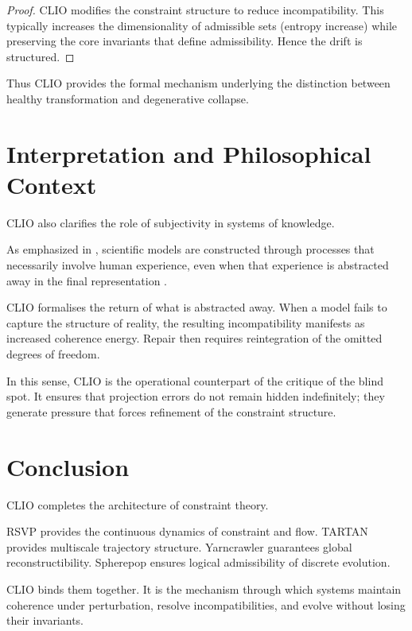 \documentclass[11pt,openany]{book}
\begin{document}
\begin{proof}
CLIO modifies the constraint structure to reduce
incompatibility.  This typically increases the dimensionality
of admissible sets (entropy increase) while preserving the
core invariants that define admissibility.  Hence the drift
is structured.
\end{proof}

Thus CLIO provides the formal mechanism underlying the
distinction between healthy transformation and degenerative
collapse.

\section{Interpretation and Philosophical Context}
\label{sec:interpretation_b}

CLIO also clarifies the role of subjectivity in systems of
knowledge.

As emphasized in \cite{thompson2023blindspot}, scientific
models are constructed through processes that necessarily
involve human experience, even when that experience is
abstracted away in the final representation .

CLIO formalises the return of what is abstracted away.  When
a model fails to capture the structure of reality, the
resulting incompatibility manifests as increased coherence
energy.  Repair then requires reintegration of the omitted
degrees of freedom.

In this sense, CLIO is the operational counterpart of the
critique of the blind spot.  It ensures that projection
errors do not remain hidden indefinitely; they generate
pressure that forces refinement of the constraint
structure.

\section{Conclusion}
\label{sec:conclusion}

CLIO completes the architecture of constraint theory.

RSVP provides the continuous dynamics of constraint and
flow.  TARTAN provides multiscale trajectory structure.
Yarncrawler guarantees global reconstructibility.  Spherepop
ensures logical admissibility of discrete evolution.

CLIO binds them together.  It is the mechanism through
which systems maintain coherence under perturbation,
resolve incompatibilities, and evolve without losing their
invariants.
\end{document}
